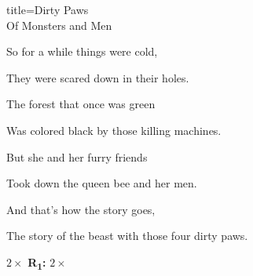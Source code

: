 \begin{song}{title=\predtitle\centering Dirty Paws \\\large Of Monsters and Men  \vspace*{-0.3cm}}
\begin{centerjustified}
\vspace{-0.1cm}

\sloka
    So for a while things were cold,

    They were scared down in their holes.

    The forest that once was green

    Was colored black by those killing machines.

    But she and her furry friends

    Took down the queen bee and her men.

    And that's how the story goes,

    The story of the beast with those four dirty paws.

\vspace{-0.1cm}

 $2\times$ \textbf{R\textsubscript{1}:} $2\times$



\end{centerjustified}
\setcounter{Slokočet}{0}
\end{song}
